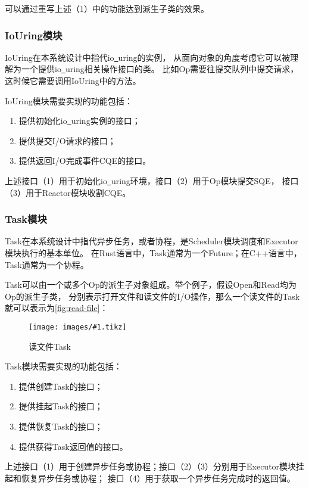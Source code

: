 \documentclass[supercite]{HustGraduPaper}
\newcommand{\cfig}[3]{
  \begin{figure}[htb]
    \centering
    \texttt{[image: images/\#1.tikz]}
    \caption{#3}
    \label{fig:#1}
  \end{figure}
}
\newcommand{\rfig}[1]{\autoref{fig:#1}}
\theoremstyle{definition}
\begin{document}
可以通过重写上述（1）中的功能达到派生子类的效果。\par

\subsubsection{IoUring模块}

IoUring在本系统设计中指代io\underline{~}uring的实例，
从面向对象的角度考虑它可以被理解为一个提供io\underline{~}uring相关操作接口的类。
比如Op需要往提交队列中提交请求，这时候它需要调用IoUring中的方法。\par

IoUring模块需要实现的功能包括：

\begin{enumerate}
  \item 提供初始化io\underline{~}uring实例的接口；
  \item 提供提交I/O请求的接口；
  \item 提供返回I/O完成事件CQE的接口。
\end{enumerate}

上述接口（1）用于初始化io\underline{~}uring环境，接口（2）用于Op模块提交SQE，
接口（3）用于Reactor模块收割CQE。\par

\subsubsection{Task模块}

Task在本系统设计中指代异步任务，或者协程，是Scheduler模块调度和Executor模块执行的基本单位。
在Rust语言中，Task通常为一个Future；在C++语言中，Task通常为一个协程。\par

Task可以由一个或多个Op的派生子对象组成。举个例子，假设Open和Read均为Op的派生子类，
分别表示打开文件和读文件的I/O操作，那么一个读文件的Task就可以表示为\rfig{read-file}：

\cfig{read-file}{0.4}{读文件Task}

Task模块需要实现的功能包括：

\begin{enumerate}
  \item 提供创建Task的接口；
  \item 提供挂起Task的接口；
  \item 提供恢复Task的接口；
  \item 提供获得Task返回值的接口。
\end{enumerate}

上述接口（1）用于创建异步任务或协程；接口（2）（3）分别用于Executor模块挂起和恢复异步任务或协程；
接口（4）用于获取一个异步任务完成时的返回值。\par
\end{document}
